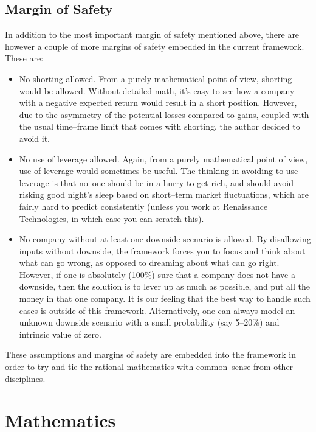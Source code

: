 \documentclass{article}
\begin{document}
\subsection{Margin of Safety}
\label{sec:safetyMargin}

In addition to the most important margin of safety mentioned above, there are
however a couple of more margins of safety embedded in the current framework.
These are:
\begin{itemize}
    \item No shorting allowed. From a purely mathematical point of view,
    shorting would be allowed. Without detailed math, it's easy to see how a
    company with a negative expected return would result in a short position.
    However, due to the asymmetry of the potential losses compared to gains,
    coupled with the usual time--frame limit that comes with shorting, the
    author decided to avoid it.
    \item No use of leverage allowed. Again, from a purely mathematical point of
    view, use of leverage would sometimes be useful. The thinking in avoiding to
    use leverage is that no--one should be in a hurry to get rich, and should
    avoid risking good night's sleep based on short--term market fluctuations,
    which are fairly hard to predict consistently (unless you work at
    Renaissance Technologies, in which case you can scratch this).
    \item No company without at least one downside scenario is allowed. By
    disallowing inputs without downside, the framework forces you to focus and
    think about what can go wrong, as opposed to dreaming about what can go
    right. However, if one is absolutely (100\%) sure that a company does not
    have a downside, then the solution is to lever up as much as possible, and
    put all the money in that one company. It is our feeling that the best way
    to handle such cases is outside of this framework. Alternatively, one can
    always model an unknown downside scenario with a small probability (say
    5--20\%) and intrinsic value of zero.
\end{itemize}

These assumptions and margins of safety are embedded into the framework in order
to try and tie the rational mathematics with common--sense from other
disciplines.

\section{Mathematics}
\label{sec:mathematics}
\end{document}
